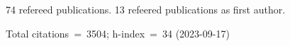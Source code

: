 74 refereed publications. 13 refeered publications as first author.

Total citations~=~3504; h-index~=~34 (2023-09-17)